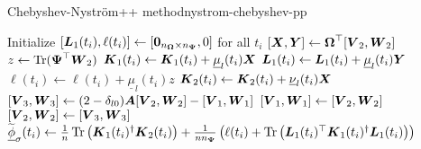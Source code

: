 \begin{algo}{Chebyshev-Nyström++ method}{nystrom-chebyshev-pp}
\begin{algorithmic}[1]
    \State Initialize $[\boldsymbol{L}_1(t_i), \ell(t_i)] \gets [\boldsymbol{0}_{n_{\boldsymbol{\Omega}} \times n_{\boldsymbol{\Psi}}}, 0]$ for all $t_i$
    \State $[\boldsymbol{X}, \boldsymbol{Y}] \gets \boldsymbol{\boldsymbol{\Omega}}^{\top} [\boldsymbol{V}_2, \boldsymbol{W}_2]$  
      \State $z \gets \operatorname{Tr}(\boldsymbol{\Psi}^{\top} \boldsymbol{W}_2)$
            \State $\boldsymbol{K}_1(t_i) \gets \boldsymbol{K}_1(t_i) + \underline{\mu}_l(t_i) \boldsymbol{X}$ 
            \State $\boldsymbol{L}_1(t_i) \gets \boldsymbol{L}_1(t_i) + \underline{\mu}_l(t_i) \boldsymbol{Y}$ 
            \State $\ell(t_i) \gets \ell(t_i) + \underline{\mu}_l(t_i) z$ 
        \EndIf
        \State $\boldsymbol{K}_2(t_i) \gets \boldsymbol{K}_2(t_i) + \underline{\nu}_l(t_i) \boldsymbol{X}$ 
      \EndFor
      \State $[\boldsymbol{V}_3, \boldsymbol{W}_3] \gets (2 - \delta_{l0}) \boldsymbol{A} [\boldsymbol{V}_2, \boldsymbol{W}_2] - [\boldsymbol{V}_1, \boldsymbol{W}_1]$ 
      \State $[\boldsymbol{V}_1, \boldsymbol{W}_1] \gets [\boldsymbol{V}_2, \boldsymbol{W}_2]$
      \State $[\boldsymbol{V}_2, \boldsymbol{W}_2] \gets [\boldsymbol{V}_3, \boldsymbol{W}_3]$
    \EndFor
      \State $\widetilde{\underline{\phi}}_{\sigma}(t_i) \gets \frac{1}{n} \operatorname{Tr}\left( \boldsymbol{K}_1(t_i)^{\dagger}\boldsymbol{K}_2(t_i) \right) + \frac{1}{n n_{\boldsymbol{\Psi}}} \left( \ell(t_i) + \operatorname{Tr}\left( \boldsymbol{L}_1(t_i)^{\top} \boldsymbol{K}_1(t_i)^{\dagger} \boldsymbol{L}_1(t_i) \right)  \right) $ \label{lin:4-nystromchebyshev-nystrom-pp}
    \EndFor
\end{algorithmic}
\end{algo}

